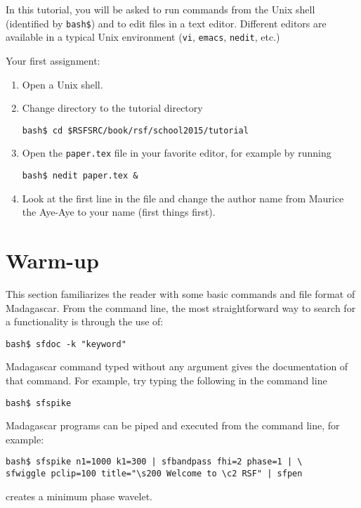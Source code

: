 In this tutorial, you will be asked to run commands from the Unix
shell (identified by \texttt{bash\$}) and to edit files in a text
editor. Different editors are available in a typical Unix environment
(\texttt{vi}, \texttt{emacs}, \texttt{nedit}, etc.)

Your first assignment:
\begin{enumerate}
\item Open a Unix shell.
\item Change directory to the tutorial directory
\begin{verbatim}
bash$ cd $RSFSRC/book/rsf/school2015/tutorial
\end{verbatim}
\item Open the \texttt{paper.tex} file in your favorite editor, for example by
running
\begin{verbatim}
bash$ nedit paper.tex & 
\end{verbatim}
\item Look at the first line in the file and change the author name from Maurice the Aye-Aye to your name (first things first). 
\end{enumerate}

\section{Warm-up}
This section familiarizes the reader with some basic commands and
file format of Madagascar. From the command line, the most
straightforward way to search for a functionality is through the use of:
\begin{verbatim}
bash$ sfdoc -k "keyword"
\end{verbatim}
Madagascar command typed without any argument gives the documentation
of that command. For example, try typing the following in the command line
\begin{verbatim}
bash$ sfspike
\end{verbatim}
Madagascar programs can be piped and executed from the command line,
for example:
\begin{verbatim}
bash$ sfspike n1=1000 k1=300 | sfbandpass fhi=2 phase=1 | \
sfwiggle pclip=100 title="\s200 Welcome to \c2 RSF" | sfpen
\end{verbatim}
creates a minimum phase wavelet.
 
